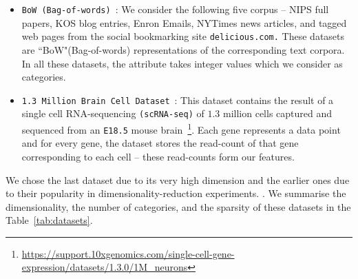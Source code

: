 \begin{itemize}
    \item \texttt{BoW (Bag-of-words)}~\cite{UCI,DeliciousMIL}: We consider the following five corpus -- NIPS full papers, KOS blog entries, Enron Emails, NYTimes news articles, and tagged web pages from the social bookmarking site \texttt{delicious.com.} These datasets are ``BoW"(Bag-of-words) representations of the corresponding text corpora. In all these datasets, the attribute takes integer values which we consider as categories.
    \item \texttt{1.3 Million Brain Cell Dataset}~\cite{genomics20171}: This dataset contains the result of a single cell RNA-sequencing \texttt{(scRNA-seq)} of $1.3$ million cells captured and sequenced from an \texttt{E18.5} mouse brain~\footnote{\url{https://support.10xgenomics.com/single-cell-gene-expression/datasets/1.3.0/1M_neurons}}. Each gene represents a data point and for every gene, the dataset stores the read-count of that gene corresponding to each cell -- these read-counts form our features.
\end{itemize}

We chose the last dataset due to its very high dimension and the earlier ones due to their popularity in dimensionality-reduction experiments. . We summarise the dimensionality, the number of categories, and the sparsity of these datasets in the Table~\ref{tab:datasets}.



